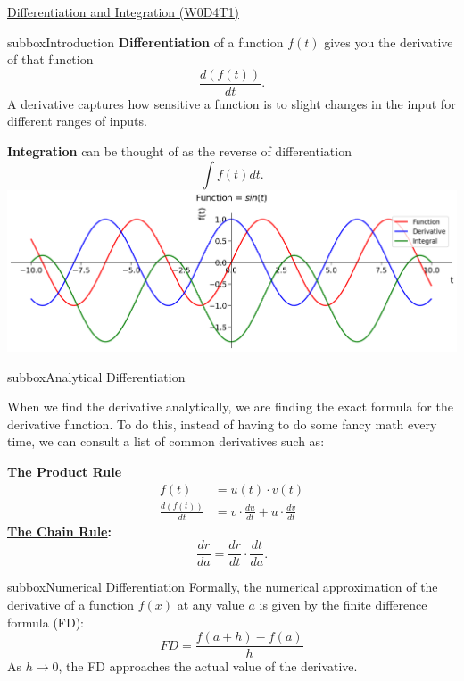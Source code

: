 \begin{multicols}{3}
\clearpage
\begin{textbox}{\href{https://compneuro.neuromatch.io/tutorials/W0D4_Calculus/student/W0D4_Tutorial1.html}{Differentiation and Integration (W0D4T1)}  }
\begin{subbox}{subbox}{Introduction}
\scriptsize
\textbf{Differentiation} of a function $f(t)$ gives you the derivative of that function \begin{equation} \frac{d(f(t))}{dt}.
\end{equation} A derivative captures how sensitive a function is to slight changes in the input for different ranges of inputs. 

\textbf{Integration} can be thought of as the reverse of differentiation
\begin{equation}
\int f(t)dt.
\end{equation}
\centering
\includegraphics[scale=0.15]{Figures/PreCourse/CFigure1.png}
\end{subbox}

\begin{subbox}{subbox}{Analytical Differentiation}
\scriptsize{
When we find the derivative analytically, we are finding the exact formula for the derivative function. 
To do this, instead of having to do some fancy math every time, we can consult a list of common derivatives such as:

\textbf{ \href{https://en.wikipedia.org/wiki/Product_rule}{The Product Rule}}
\begin{align}
f(t) &= u(t)\cdot v(t) \\
\frac{d(f(t))}{dt} &= v\cdot \frac{du}{dt} + u\cdot \frac{dv}{dt}
\end{align}
\textbf{\href{https://en.wikipedia.org/wiki/Chain_rule}{The Chain Rule}:}
\begin{equation}
\frac{dr}{da} = \frac{dr}{dt}\cdot\frac{dt}{da}.
\end{equation}
}
\end{subbox}
\begin{subbox}{subbox}{Numerical Differentiation}
\scriptsize{Formally, the numerical approximation of the derivative of a function $f(x)$ at any value $a$ is given by the finite difference formula (FD): 
\begin{equation}
FD = \frac{f(a+h) - f(a)}{h}
\end{equation}
As $h\rightarrow 0$, the FD approaches the actual value of the derivative.}


\end{subbox}
\end{textbox}
\end{multicols}
